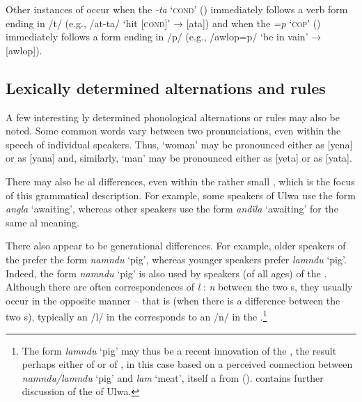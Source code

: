 Other instances of  occur when the   \textit{-ta} ‘\textsc{cond}’ () immediately follows a verb form ending in /t/ (e.g., /at-ta/ ‘hit [\textsc{cond}]’ → [ata]) and when the  \textit{=p} ‘\textsc{cop}’ () immediately follows a form ending in /p/ (e.g., /awlop=p/ ‘be in vain’ → [awlop]).


\subsection{Lexically determined alternations and rules}\label{sec:2.5.9}


A few interesting ly determined phonological alternations or rules may also be noted. Some common words vary between two pronunciations, even within the speech of individual speakers. Thus, ‘woman’ may be pronounced either as [yena] or as [yana] and, similarly, ‘man’ may be pronounced either as [yeta] or as [yata].

  There may also be al differences, even within the rather small  , which is the focus of this grammatical description. For example, some speakers of  Ulwa use the form \textit{angla} ‘awaiting’, whereas other speakers use the form \textit{andïla} ‘awaiting’ for the same al meaning.

  There also appear to be generational differences. For example, older speakers of the   prefer the form \textit{namndu} ‘pig’, whereas younger speakers prefer \textit{lamndu} ‘pig’. Indeed, the form \textit{namndu} ‘pig’ is also used by speakers (of all ages) of the  . Although there are often correspondences of \textit{l} : \textit{n} between the two s, they usually occur in the opposite manner -- that is (when there is a difference between the two s), typically an /l/ in the   corresponds to an /n/ in the  .\footnote{The form \textit{lamndu} ‘pig’ may thus be a recent innovation of the  , the result perhaps either of  or of , in this case based on a perceived connection between \textit{namndu/lamndu} ‘pig’ and \textit{lam} ‘meat’, itself a  from  ().  contains further discussion of the   of Ulwa.}

